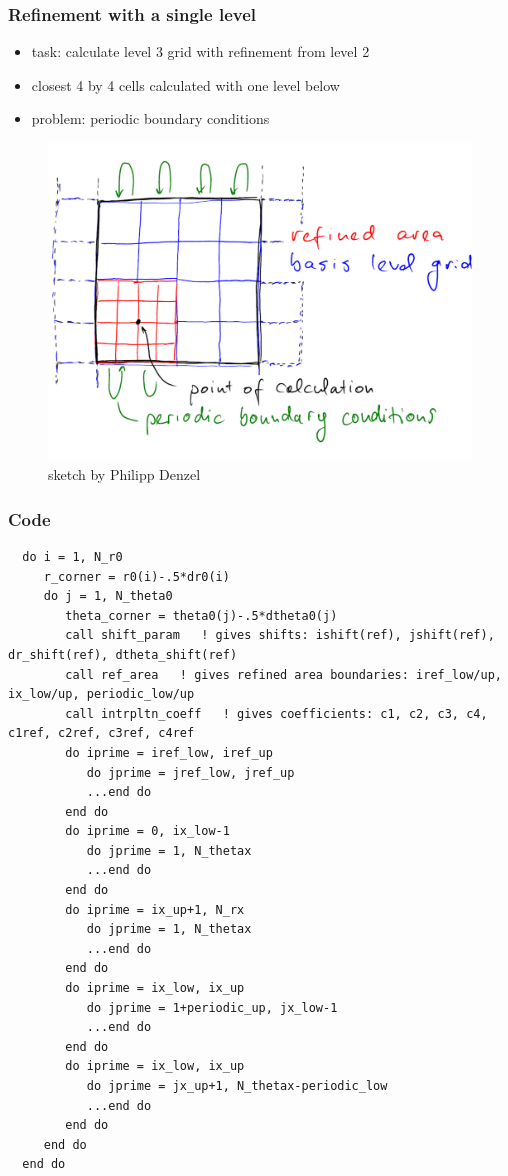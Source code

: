 \documentclass{beamer}
\begin{document}
\begin{frame}
 \frametitle{Refinement with a single level}
 \begin{itemize}
  \item task: calculate level 3 grid with refinement from level 2
  \item closest 4 by 4 cells calculated with one level below
  \item problem: periodic boundary conditions
 \end{itemize}
 \begin{figure}[H]
  \centering
  \includegraphics[width=.5\textwidth]{reimagined_sketch2.pdf}
  \caption{sketch by Philipp Denzel}
\end{figure}
\end{frame}
\begin{frame}[fragile]
 \frametitle{Code}
 \begin{lstlisting}
  do i = 1, N_r0
     r_corner = r0(i)-.5*dr0(i)
     do j = 1, N_theta0
        theta_corner = theta0(j)-.5*dtheta0(j)
        call shift_param   ! gives shifts: ishift(ref), jshift(ref), dr_shift(ref), dtheta_shift(ref)
        call ref_area   ! gives refined area boundaries: iref_low/up, ix_low/up, periodic_low/up
        call intrpltn_coeff   ! gives coefficients: c1, c2, c3, c4, c1ref, c2ref, c3ref, c4ref
        do iprime = iref_low, iref_up
           do jprime = jref_low, jref_up
           ...end do
        end do
        do iprime = 0, ix_low-1
           do jprime = 1, N_thetax
           ...end do
        end do
        do iprime = ix_up+1, N_rx
           do jprime = 1, N_thetax
           ...end do
        end do
        do iprime = ix_low, ix_up
           do jprime = 1+periodic_up, jx_low-1
           ...end do
        end do
        do iprime = ix_low, ix_up
           do jprime = jx_up+1, N_thetax-periodic_low
           ...end do
        end do
     end do
  end do
 \end{lstlisting}
\end{frame}
\end{document}
